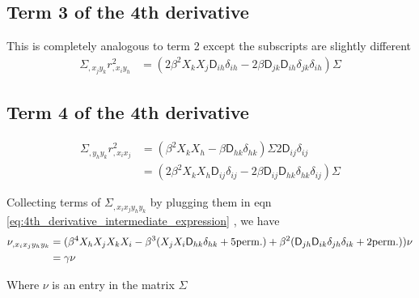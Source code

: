 \subsection{Term 3 of the 4th derivative}
This is completely analogous to term 2 except the subscripts are slightly
different
\begin{align*}
\Sigma_{,x_j y_k} r^2_{,x_i y_h}
&=\boxed { ( 2 \beta^2  X_k X_j \mathsf{D}_{ih} \delta_{ih} 
-2 \beta \mathsf{D}_{jk} \mathsf{D}_{ih} \delta_{jk} \delta_{ih}) \Sigma} 
\end{align*}

\subsection{Term 4 of the 4th derivative} 
\begin{align*}
\Sigma_{,y_h y_k} r^2_{,x_i x_j}
&= (\beta^2 X_k X_h - \beta \mathsf{D}_{hk}\delta_{hk})\Sigma 2 \mathsf{D}_{ij} \delta_{ij}\\ 
&= \boxed{(2\beta^2 X_k X_h \mathsf{D}_{ij} \delta_{ij} - 2\beta \mathsf{D}_{ij} \mathsf{D}_{hk} \delta_{hk}
\delta_{ij})\Sigma } 
\end{align*}

Collecting terms of $\Sigma_{,x_i x_j y_h y_k}$ by plugging them in eqn
\ref{eq:4th_derivative_intermediate_expression}
, we have 
\begin{align}
\nu_{,x_i x_j y_h y_k} &= (\beta^4 X_h X_j X_k X_i -  
\beta^3 (X_j X_i \mathsf{D}_{hk} \delta_{hk} + 5 {\rm perm.}) + \beta^2
(\mathsf{D}_{jh} \mathsf{D}_{ik}\delta_{jh}\delta_{ik} + 2 {\rm perm.})) \nu \\
&= \gamma \nu
\end{align}

Where $\nu$ is an entry in the matrix $\Sigma$

